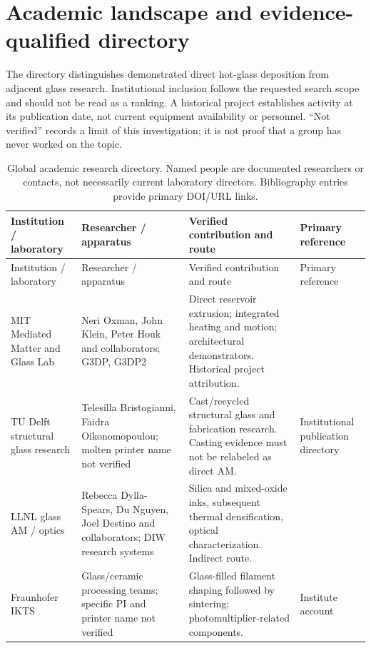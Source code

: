 \section{Academic landscape and evidence-qualified directory}
\label{sec:directory}
The directory distinguishes demonstrated direct hot-glass deposition from adjacent glass research. Institutional inclusion follows the requested search scope and should not be read as a ranking. A historical project establishes activity at its publication date, not current equipment availability or personnel. ``Not verified'' records a limit of this investigation; it is not proof that a group has never worked on the topic.

\begin{longtable}{P{0.18\textwidth}P{0.22\textwidth}P{0.30\textwidth}P{0.20\textwidth}}
\caption{Global academic research directory. Named people are documented researchers or contacts, not necessarily current laboratory directors. Bibliography entries provide primary DOI/URL links.}\label{tab:academic_directory}\\
\toprule
Institution / laboratory & Researcher / apparatus & Verified contribution and route & Primary reference \\
\midrule
\endfirsthead
\toprule
Institution / laboratory & Researcher / apparatus & Verified contribution and route & Primary reference \\
\midrule
\endhead
MIT Mediated Matter and Glass Lab & Neri Oxman, John Klein, Peter Houk and collaborators; G3DP, G3DP2 & Direct reservoir extrusion; integrated heating and motion; architectural demonstrators. Historical project attribution. & \cite{acad_klein2015,acad_inamura2018} \\
TU Delft structural glass research & Telesilla Bristogianni, Faidra Oikonomopoulou; molten printer name not verified & Cast/recycled structural glass and fabrication research. Casting evidence must not be relabeled as direct AM. & Institutional publication directory \cite{acad_delft} \\
LLNL glass AM / optics & Rebecca Dylla-Spears, Du Nguyen, Joel Destino and collaborators; DIW research systems & Silica and mixed-oxide inks, subsequent thermal densification, optical characterization. Indirect route. & \cite{acad_nguyen2017,acad_destino2018} \\
Fraunhofer IKTS & Glass/ceramic processing teams; specific PI and printer name not verified & Glass-filled filament shaping followed by sintering; photomultiplier-related components. & Institute account \cite{acad_ikts} \\

\end{longtable}
